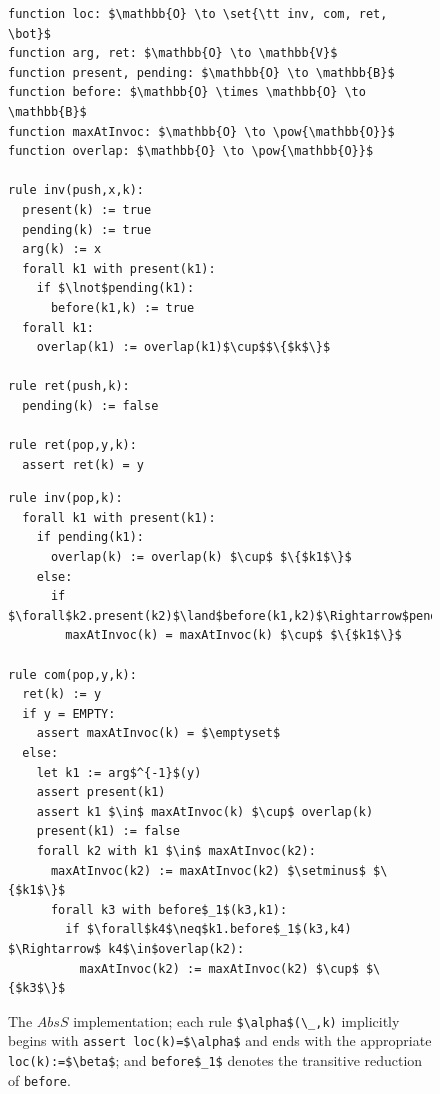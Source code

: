 \begin{figure}[t]
  \begin{minipage}[t]{0.39\linewidth}
    \begin{lstlisting}
function loc: $\mathbb{O} \to \set{\tt inv, com, ret, \bot}$
function arg, ret: $\mathbb{O} \to \mathbb{V}$
function present, pending: $\mathbb{O} \to \mathbb{B}$
function before: $\mathbb{O} \times \mathbb{O} \to \mathbb{B}$
function maxAtInvoc: $\mathbb{O} \to \pow{\mathbb{O}}$
function overlap: $\mathbb{O} \to \pow{\mathbb{O}}$

rule inv(push,x,k):
  present(k) := true
  pending(k) := true
  arg(k) := x
  forall k1 with present(k1):
    if $\lnot$pending(k1):
      before(k1,k) := true
  forall k1:
    overlap(k1) := overlap(k1)$\cup$$\{$k$\}$

rule ret(push,k):
  pending(k) := false

rule ret(pop,y,k):
  assert ret(k) = y
    \end{lstlisting}
  \end{minipage}
  \begin{minipage}[t]{0.59\linewidth}
    \begin{lstlisting}
rule inv(pop,k):
  forall k1 with present(k1):
    if pending(k1):
      overlap(k) := overlap(k) $\cup$ $\{$k1$\}$
    else:
      if $\forall$k2.present(k2)$\land$before(k1,k2)$\Rightarrow$pending(k2):
        maxAtInvoc(k) = maxAtInvoc(k) $\cup$ $\{$k1$\}$

rule com(pop,y,k):
  ret(k) := y
  if y = EMPTY:
    assert maxAtInvoc(k) = $\emptyset$
  else:
    let k1 := arg$^{-1}$(y)
    assert present(k1)
    assert k1 $\in$ maxAtInvoc(k) $\cup$ overlap(k)
    present(k1) := false
    forall k2 with k1 $\in$ maxAtInvoc(k2):
      maxAtInvoc(k2) := maxAtInvoc(k2) $\setminus$ $\{$k1$\}$
      forall k3 with before$_1$(k3,k1):
        if $\forall$k4$\neq$k1.before$_1$(k3,k4) $\Rightarrow$ k4$\in$overlap(k2):
          maxAtInvoc(k2) := maxAtInvoc(k2) $\cup$ $\{$k3$\}$
    \end{lstlisting}
  \end{minipage}
  \caption{The $AbsS$ implementation; each rule \lstinline|$\alpha$(\_,k)|
  implicitly begins with \lstinline|assert loc(k)=$\alpha$| and ends with the
  appropriate \lstinline|loc(k):=$\beta$|; and \lstinline|before$_1$| denotes
  the transitive reduction of \lstinline|before|.}
  \label{fig:transitions:AbsS}
\end{figure}

